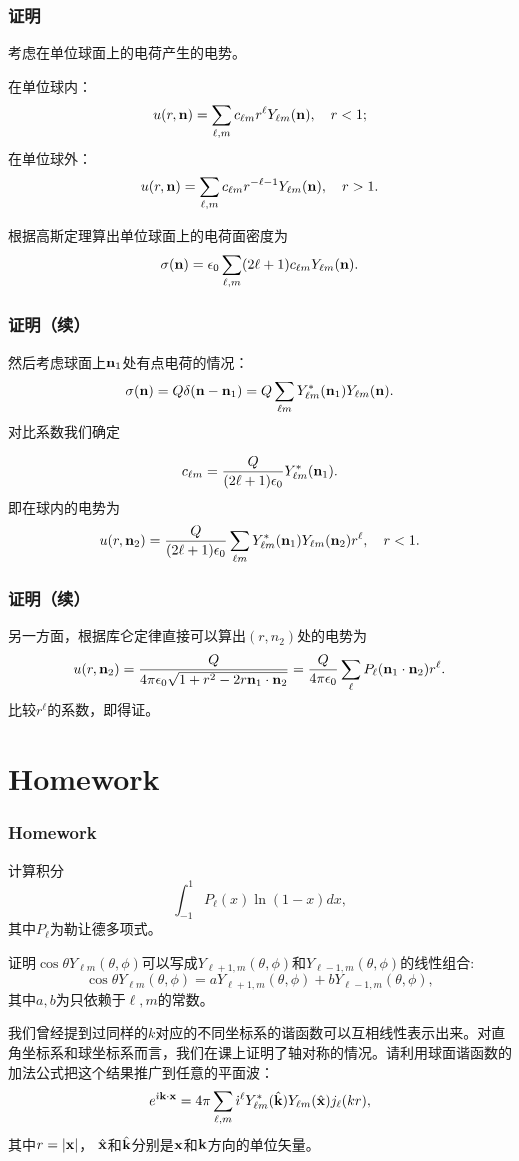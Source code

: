 \documentclass[CJK]{beamer}
\begin{document}
\begin{frame}
  \frametitle{证明}
  
  考虑在单位球面上的电荷产生的电势。

  在单位球内：
  $$ u(r, {\mathbf{n}}) = \sum_{\ell,m}c_{\ell m}r^\ell Y_{\ell m}({\mathbf{n}}),\ \ \ r<1 ;$$
  在单位球外：
  $$ u(r, {\mathbf{n}}) = \sum_{\ell,m}c_{\ell m}r^{-\ell-1} Y_{\ell m}({\mathbf{n}}),\ \ \ r>1 .$$
  
  根据高斯定理算出单位球面上的电荷面密度为
  $$\sigma({\mathbf{n}}) = \epsilon_0 \sum_{\ell,m}(2\ell+1)c_{\ell m}Y_{\ell m}({\mathbf{n}}).$$
  
\end{frame}


\begin{frame}
  \frametitle{证明（续）}
  
  然后考虑球面上${\mathbf{n}}_1$处有点电荷的情况：
  $$\sigma({\mathbf{n}}) = Q \delta({\mathbf{n}}-{\mathbf{n}}_1) = Q\sum_{\ell m}Y_{\ell m}^*({\mathbf{n}}_1)Y_{\ell m}({\mathbf{n}}).$$
  对比系数我们确定
  
  $$ c_{\ell m} = \frac{Q}{(2\ell+1)\epsilon_0}  Y_{\ell m}^*({\mathbf{n}}_1). $$
  即在球内的电势为
  $$ u(r,{\mathbf{n}}_2)= \frac{Q}{(2\ell+1)\epsilon_0} \sum_{\ell m} Y_{\ell m}^*({\mathbf{n}}_1)Y_{\ell m}({\mathbf{n}}_2)r^\ell,  \ \ \ r<1. $$
  
\end{frame}

\begin{frame}
  \frametitle{证明（续）}
  
  另一方面，根据库仑定律直接可以算出$(r, n_2)$处的电势为
  $$u(r,{\mathbf{n}}_2) = \frac{Q}{4\pi\epsilon_0\sqrt{1+r^2-2r{\mathbf{n}}_1\cdot{\mathbf{n}}_2}} = \frac{Q}{4\pi\epsilon_0}\sum_{\ell}P_\ell({\mathbf{n}}_1\cdot{\mathbf{n}}_2) r^\ell .$$
  比较$r^\ell$的系数，即得证。
  
\end{frame}


\section{Homework}

\begin{frame}
\frametitle{Homework}

\bitem
\item{计算积分
  $$\int_{-1}^1 P_\ell(x)\ln(1-x)dx, $$
其中$P_\ell$为勒让德多项式。
}
\item{证明$\cos\theta Y_{\ell m}(\theta,\phi)$可以写成$Y_{\ell+1,m}(\theta,\phi)$和$Y_{\ell-1,m}(\theta,\phi)$的线性组合:
  $$ \cos\theta Y_{\ell m}(\theta,\phi) = a Y_{\ell+1,m}(\theta,\phi)+ b Y_{\ell-1,m}(\theta,\phi), $$
  其中$a, b$为只依赖于$\ell, m$的常数。
  }
\item{我们曾经提到过同样的$k$对应的不同坐标系的谐函数可以互相线性表示出来。对直角坐标系和球坐标系而言，我们在课上证明了轴对称的情况。请利用球面谐函数的加法公式把这个结果推广到任意的平面波：
  $$ e^{{\dot{\imath}} {\mathbf{k}}\cdot{\mathbf{x}}} = 4\pi \sum_{\ell, m}{\dot{\imath}}^\ell Y_{\ell m}^*(\hat{{\mathbf{k}}})Y_{\ell m}(\hat{{\mathbf{x}}})j_{\ell}(kr),$$
其中$r=|{\mathbf{x}}|$， $\hat{{\mathbf{x}}}$和$\hat{{\mathbf{k}}}$分别是${\mathbf{x}}$和${\mathbf{k}}$方向的单位矢量。}
  \eitem

\end{frame}
\end{document}
